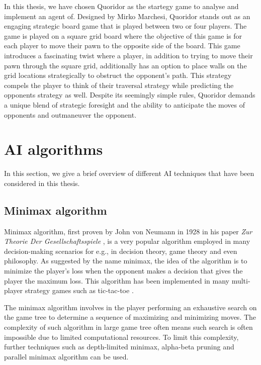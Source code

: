 In this thesis, we have chosen Quoridor as the startegy game to analyse and implement an agent of. Designed by Mirko Marchesi, Quoridor stands out as an engaging strategic board game that is played between two or four players. The game is played on a square grid board where the objective of this game is for each player to move their pawn to the opposite side of the board. This game introduces a fascinating twist where a player, in addition to trying to move their pawn through the square grid, additionally has an option to place walls on the grid locations strategically to obstruct the opponent's path. This strategy compels the player to think of their traversal strategy while predicting the opponents strategy as well. Despite its seemingly simple rules, Quoridor demands a unique blend of strategic foresight and the ability to anticipate the moves of opponents and outmaneuver the opponent.


\section{AI algorithms}
In this section, we give a brief overview of different \gls{AI} techniques that have been considered in this thesis.

\subsection{Minimax algorithm}
Minimax algorithm, first proven by John von Neumann in 1928 in his paper \textit{Zur Theorie Der Gesellschaftsspiele} \citep{v1928theorie}, is a very popular algorithm employed in many decision-making scenarios for e.g., in decision theory, game theory and even philosophy. As suggested by the name minimax, the idea of the algorithm is to minimize the player's loss when the opponent makes a decision that gives the player the maximum loss. This algorithm has been implemented in many multi-player strategy games such as tic-tac-toe \citep{savelli2008tic}. 

The minimax algorithm involves in the player performing an exhaustive search on the game tree to determine a sequence of maximizing and minimizing moves. The complexity of such algorithm in large game tree often means such search is often impossible due to limited computational resources. To limit this complexity, further techniques such as depth-limited minimax, alpha-beta pruning and parallel minimax algorithm can be used.

